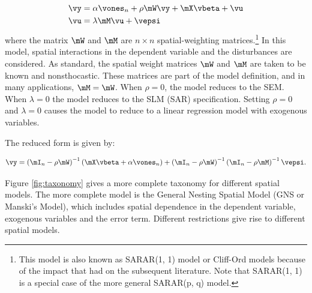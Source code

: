 \documentclass[english,12pt]{book}\usepackage[]{graphicx}\usepackage[]{xcolor}
\begin{document}
\begin{equation}
  \begin{aligned}
\vy &= \alpha \vones_n + \rho \mW\vy + \mX\vbeta + \vu \\
\vu &= \lambda \mM\vu + \vepsi \\
  \end{aligned}
\end{equation}
%
where the matrix $\mW$ and $\mM$ are $n\times n$ spatial-weighting matrices.\footnote{This model is also known as SARAR(1, 1) model or Cliff-Ord models because of the impact that \cite{cliff1973spatial}  had on the subsequent literature. Note that SARAR(1, 1) is  a special case of the more general SARAR(p, q) model.} In this model, spatial interactions in the dependent variable and the disturbances are considered. As standard, the spatial weight matrices $\mW$ and $\mM$ are taken to be known and nonsthocastic. These matrices are part of the model definition, and in many applications, $\mM = \mW$. When $\rho = 0$, the model reduces to the SEM. When $\lambda = 0$ the model reduces to the SLM (SAR) specification. Setting $\rho = 0$ and $\lambda = 0$ causes the model to reduce to a linear regression model with exogenous variables. 

The reduced form is given by:

\begin{equation}
\vy = \left(\mI_n - \rho \mW\right)^{-1}\left(\mX\vbeta + \alpha \vones_n\right) + \left(\mI_n - \rho\mW\right)^{-1}\left(\mI_n - \rho \mM\right)^{-1}\vepsi.
\end{equation}

Figure \ref{fig:taxonomy} gives a more complete taxonomy for different spatial models. The more complete model is the General Nesting Spatial Model (GNS or Manski's Model), which includes spatial dependence in the dependent variable, exogenous variables and the error term. Different restrictions give rise to different spatial models. 
\end{document}
